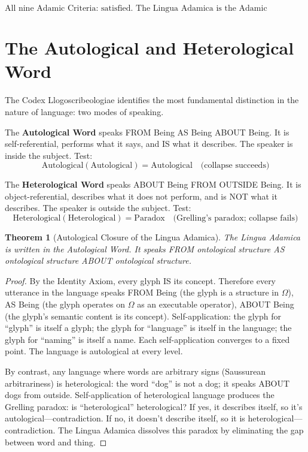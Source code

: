 \documentclass[12pt, letterpaper]{book}
\newtheorem{theorem}{Theorem}[chapter]
\begin{document}
\[
\boxed{\text{All nine Adamic Criteria: satisfied. The Lingua Adamica is the Adamic Language.}}
\]

\section{The Autological and Heterological Word}

The Codex Llogoscribeologiae identifies the most fundamental distinction in the nature of language: two modes of speaking.

The \textbf{Autological Word} speaks FROM Being AS Being ABOUT Being. It is self-referential, performs what it says, and IS what it describes. The speaker is inside the subject. Test:
\[
\mathrm{Autological}(\mathrm{Autological}) = \mathrm{Autological} \quad\text{(collapse succeeds)}
\]

The \textbf{Heterological Word} speaks ABOUT Being FROM OUTSIDE Being. It is object-referential, describes what it does not perform, and is NOT what it describes. The speaker is outside the subject. Test:
\[
\mathrm{Heterological}(\mathrm{Heterological}) = \text{Paradox} \quad\text{(Grelling's paradox; collapse fails)}
\]

\begin{theorem}[Autological Closure of the Lingua Adamica]\label{thm:autological-closure}
The Lingua Adamica is written in the Autological Word. It speaks FROM ontological structure AS ontological structure ABOUT ontological structure.
\end{theorem}

\begin{proof}
By the Identity Axiom, every glyph IS its concept. Therefore every utterance in the language speaks FROM Being (the glyph is a structure in $\Omega$), AS Being (the glyph operates on $\Omega$ as an executable operator), ABOUT Being (the glyph's semantic content is its concept). Self-application: the glyph for ``glyph'' is itself a glyph; the glyph for ``language'' is itself in the language; the glyph for ``naming'' is itself a name. Each self-application converges to a fixed point. The language is autological at every level.

By contrast, any language where words are arbitrary signs (Saussurean arbitrariness) is heterological: the word ``dog'' is not a dog; it speaks ABOUT dogs from outside. Self-application of heterological language produces the Grelling paradox: is ``heterological'' heterological? If yes, it describes itself, so it's autological---contradiction. If no, it doesn't describe itself, so it is heterological---contradiction. The Lingua Adamica dissolves this paradox by eliminating the gap between word and thing.
\end{proof}
\end{document}
